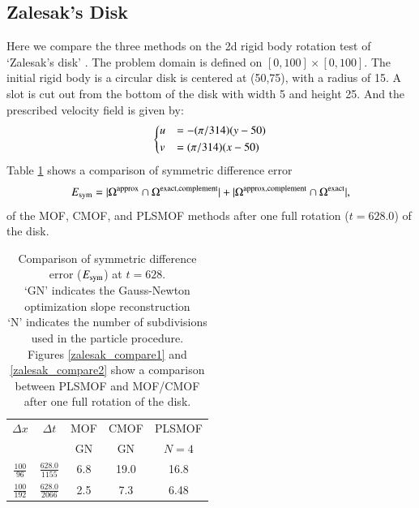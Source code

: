 \documentclass[preprint,12pt]{Definitions/elsarticle}
\newcommand{\tn}{\textnormal}
\begin{document}
\FloatBarrier
\subsection{Zalesak's Disk}
Here we compare the three methods on the 2d rigid body rotation test of `Zalesak's disk' \cite{zalesak1979fully}. The problem domain is defined on $[0,100]\times[0,100]$. The initial rigid body is a circular disk is centered at (50,75), with a radius of 15. A slot is cut out from the bottom of the disk with width 5 and height 25. And the prescribed velocity field is given by:
\begin{equation*}
\begin{dcases}
u&=-(\pi/314)(y-50)\\
v&=(\pi/314)(x-50)
\end{dcases}
\end{equation*}
\newline
Table \ref{zalesaktable} shows a comparison of symmetric difference
error
\begin{eqnarray}
E_\tn{sym}=
|\Omega^\tn{approx}\cap\Omega^\tn{exact,complement}|+
|\Omega^\tn{approx,complement}\cap\Omega^\tn{exact}|,
\label{symmetricdiff}
\end{eqnarray}
of the MOF, CMOF, and PLSMOF methods after one full rotation ($t=628.0$) of the disk.

\begin{table}[H]
	\centering	
	\caption{Comparison of symmetric difference error ($E_\tn{sym}$) at $t=628$.\\
		`GN' indicates the Gauss-Newton optimization slope reconstruction \\
		`N' indicates the number of subdivisions used in the particle procedure.\\
		Figures \ref{zalesak_compare1} and \ref{zalesak_compare2} show a comparison between PLSMOF and MOF/CMOF after one full rotation of the disk. }
	\renewcommand{\arraystretch}{1.2} %
	\begin{tabular}{|c|c|c|c|c|}
		\hline
		$\Delta x$ & $\Delta t$ & MOF   & CMOF  & PLSMOF\\ 
		& & GN & GN  & $N = 4$
		\\ \hline 
		$\frac{100}{96}$ & $\frac{628.0}{1155}$ & 6.8  & 19.0  & 16.8
		\\ \hline
		$\frac{100}{192}$ & $\frac{628.0}{2066}$ & 2.5  & 7.3   & 6.48
		\\ \hline
	\end{tabular}  
	\label{zalesaktable}	
\end{table}
\end{document}
